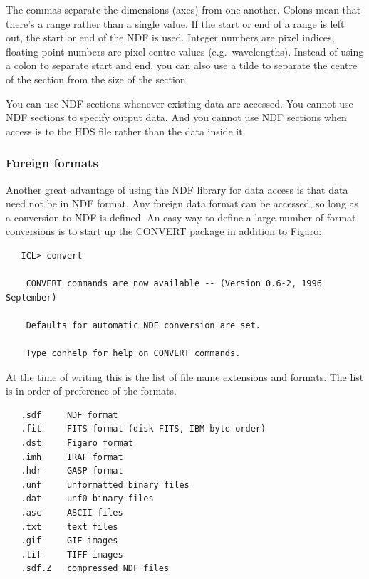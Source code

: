    The commas separate the dimensions (axes) from one another. Colons
   mean that there's a range rather than a single value. If the start
   or end of a range is left out, the start or end of the NDF is
   used. Integer numbers are pixel indices, floating point numbers are
   pixel centre values (e.g.\ wavelengths). Instead of using a colon
   to separate start and end, you can also use a tilde to separate the
   centre of the section from the size of the section.

   You can use NDF sections whenever existing data are accessed. You
   cannot use NDF sections to specify output data. And you cannot use
   NDF sections when access is to the HDS file rather than the data
   inside it.


\subsubsection{\label{filesndfforeign}Foreign formats}

   Another great advantage of using the NDF library for data access is
   that data need not be in NDF format. Any foreign data format can be
   accessed, so long as a conversion to NDF is defined. An easy way to
   define a large number of format conversions is to start up the
   CONVERT package in addition to Figaro:

\begin{verbatim}
   ICL> convert

    CONVERT commands are now available -- (Version 0.6-2, 1996 September)

    Defaults for automatic NDF conversion are set.

    Type conhelp for help on CONVERT commands.
\end{verbatim}

   At the time of writing this is the list of file name extensions and
   formats. The list is in order of preference of the formats.

\begin{verbatim}
   .sdf     NDF format
   .fit     FITS format (disk FITS, IBM byte order)
   .dst     Figaro format
   .imh     IRAF format
   .hdr     GASP format
   .unf     unformatted binary files
   .dat     unf0 binary files
   .asc     ASCII files
   .txt     text files
   .gif     GIF images
   .tif     TIFF images
   .sdf.Z   compressed NDF files
\end{verbatim}

